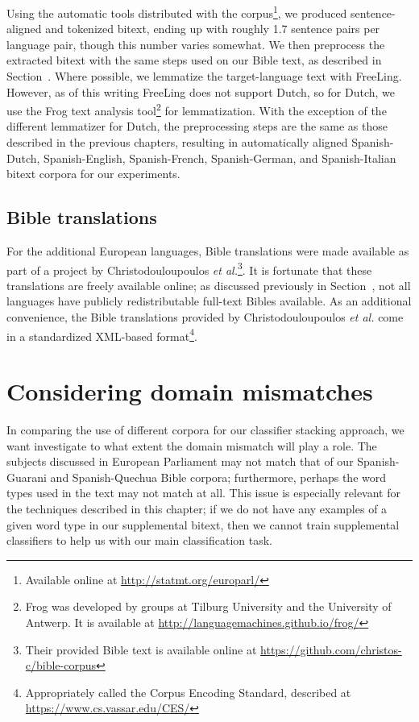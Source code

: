 Using the automatic tools distributed with the corpus\footnote{Available
online at \url{http://statmt.org/europarl/}}, we produced sentence-aligned
and tokenized bitext, ending up with roughly 1.7 sentence pairs per language
pair, though this number varies somewhat.
We then preprocess the extracted bitext with the same steps used on our Bible
text, as described in Section~\label{sec:datasetsandpreprocessing}. Where
possible, we lemmatize the target-language text with FreeLing. However, as of
this writing FreeLing does not support Dutch, so for Dutch, we use the Frog
text analysis tool\footnote{Frog was developed by groups at Tilburg University
and the University of Antwerp. It is available at
\url{http://languagemachines.github.io/frog/}} \cite{tadpole2007} for
lemmatization. With the exception of the different lemmatizer for Dutch, the
preprocessing steps are the same as those described in the previous chapters,
resulting in automatically aligned Spanish-Dutch, Spanish-English,
Spanish-French, Spanish-German, and Spanish-Italian bitext corpora for our
experiments.

\subsection{Bible translations}

For the additional European languages, Bible translations were made available
as part of a project by Christodouloupoulos \emph{et
al.}\cite{Christodouloupoulos2015}\footnote{Their provided Bible text is
available online at \url{https://github.com/christos-c/bible-corpus}}. It is
fortunate that these translations are freely available online; as discussed
previously in Section~\label{sec:datasetsandpreprocessing}, not all languages
have publicly redistributable full-text Bibles available. As an additional
convenience, the Bible translations provided by Christodouloupoulos \emph{et
al.} come in a standardized XML-based format\footnote{Appropriately called the
Corpus Encoding Standard, described at \url{https://www.cs.vassar.edu/CES/}}.

\section{Considering domain mismatches}
\label{sec:domainmismatches}
In comparing the use of different corpora for our classifier stacking approach,
we want investigate to what extent the domain mismatch will play a role.
The subjects discussed in European Parliament may not match that of our
Spanish-Guarani and Spanish-Quechua Bible corpora; furthermore, perhaps the
word types used in the text may not match at all. This issue is especially
relevant for the techniques described in this chapter; if we do not have any
examples of a given word type in our supplemental bitext, then we cannot train
supplemental classifiers to help us with our main classification task.

